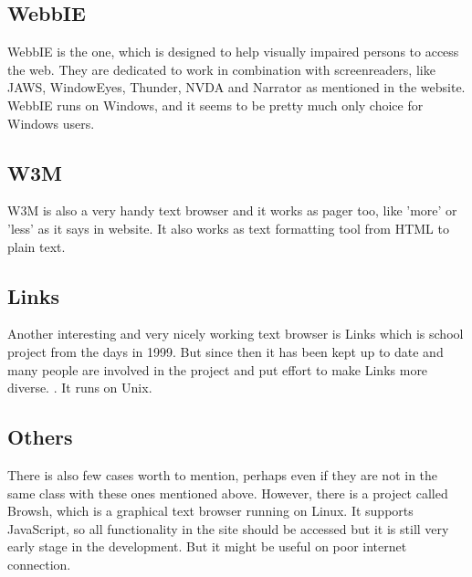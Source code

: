 \subsection[tb-webbie]{WebbIE}
WebbIE is the one, which is designed to help visually impaired persons to access the web. They are dedicated to work in combination with screenreaders, like JAWS, WindowEyes, Thunder, NVDA and Narrator as mentioned in the \textcite{webbie-main} website. WebbIE runs on Windows, and it seems to be pretty much only choice for Windows users.
\subsection[tb-w3m]{W3M}
W3M is also a very handy text browser and it works as pager too, like 'more' or 'less' as it says in \textcite{w3m} website. It also works as text formatting tool from HTML to plain text.
\subsection[tb-links]{Links}
Another interesting and very nicely working text browser is Links which is school project from the days in 1999. But since then it has been kept up to date and many people are involved in the project and put effort to make Links more diverse. \parencite{links}. It runs on Unix.
\subsection[tb-others]{Others}
There is also few cases worth to mention, perhaps even if they are not in the same class with these ones mentioned above. However, there is a project called Browsh, which is a graphical text browser running on Linux. It supports JavaScript, so all functionality in the site should be accessed but it is still very early stage in the development. But it might be useful on poor internet connection. 

